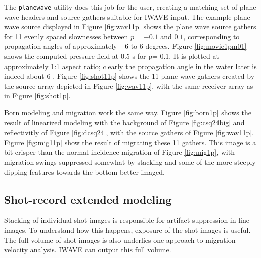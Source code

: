 The {\tt planewave} utility does this job for the user, creating a matching set of plane wave headers and source gathers suitable for IWAVE input. The example plane wave source displayed in Figure \ref{fig:wav11p} shows the plane wave source gathers for 11 evenly spaced slownesses between $p=-0.1$ and $0.1$, corresponding to propagation angles of approximately $-6$ to $6$ degrees. Figure \ref{fig:movie1pm01} shows the computed pressure field at 0.5 s for p=-0.1. It is plotted at approximately 1:1 aspect ratio; clearly the propagation angle in the water later is indeed about $6^{\circ}$.  Figure \ref{fig:shot11p} shows the 11 plane wave gathers created by the source array depicted in Figure \ref{fig:wav11p}, with the same receiver array as in Figure \ref{fig:shot1p}.




Born modeling and migration work the same way. Figure \ref{fig:born1p} shows the result of linearized modeling with the background of Figure \ref{fig:csq24big} and reflectivitly of Figure \ref{fig:dcsq24}, with the source gathers of Figure \ref{fig:wav11p}. Figure \ref{fig:mig11p} show the result of migrating these 11 gathers. This image is a bit crisper than the normal incidence migration of Figure \ref{fig:mig1p}, with migration swings suppressed somewhat by stacking and some of the more steeply dipping features towards the bottom better imaged.



\subsection{Shot-record extended modeling}

Stacking of individual shot images is responsible for artifact suppression in line images. To understand how this happens, exposure of the shot images is useful. The full volume of shot images is also underlies one approach to migration velocity analysis. IWAVE can output this full volume.

